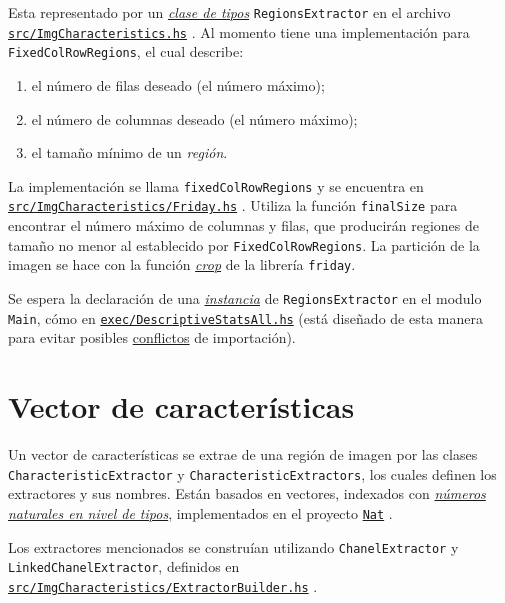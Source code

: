 \documentclass{article}
\newcommand\refcode[2]{ \href{#1}{\texttt{#2}} }
\begin{document}
Esta representado por un \href{http://learnyouahaskell.com/types-and-typeclasses}{\emph{clase de tipos}} \verb|RegionsExtractor| en el archivo 
\refcode{\ImgCharacteristics}{src/ImgCharacteristics.hs}.
Al momento tiene una implementación para \verb|FixedColRowRegions|, el cual describe:
\begin{enumerate}
\item el número de filas deseado (el número máximo);
\item el número de columnas deseado (el número máximo);
\item el tamaño mínimo de un \emph{región}.
\end{enumerate}

La implementación se llama \verb|fixedColRowRegions| y se encuentra en\\ \refcode{\Friday}{src/ImgCharacteristics/Friday.hs}. Utiliza la función \verb|finalSize| para encontrar el número máximo de columnas y filas, que producirán regiones de tamaño no menor al establecido por \verb|FixedColRowRegions|. La partición de la imagen se hace con la función \href{https://hackage.haskell.org/package/friday-0.2.2.0/docs/Vision-Image-Transform.html}{\emph{crop}} de la librería \verb|friday|.

Se espera la declaración de una \href{https://downloads.haskell.org/~ghc/7.0.1/docs/html/users_guide/type-class-extensions.html}{\emph{instancia}} de \verb|RegionsExtractor| en el modulo \verb|Main|, cómo en \refcode{\ExecAll}{exec/DescriptiveStatsAll.hs} (está diseñado de esta manera para evitar posibles \href{https://wiki.haskell.org/Multiple_instances}{conflictos} de importación).

\section{Vector de características}

Un vector de características se extrae de una región de imagen por las clases \verb|CharacteristicExtractor| y \verb|CharacteristicExtractors|, los cuales definen los extractores y sus nombres. Están basados en vectores, indexados con \href{https://wiki.haskell.org/Type_arithmetic}{\emph{números naturales en nivel de tipos}}, implementados en el proyecto \refcode{\Nat}{Nat}.

Los extractores mencionados se construían utilizando \verb|ChanelExtractor| y \verb|LinkedChanelExtractor|, definidos en \\ \refcode{\ExtractorBuilder}{src/ImgCharacteristics/ExtractorBuilder.hs}.
\end{document}
